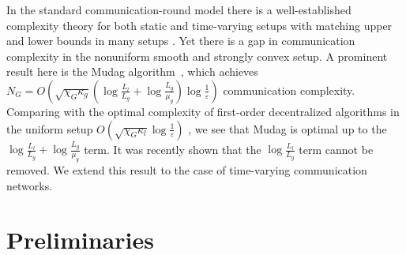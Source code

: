\documentclass[a4paper,USenglish,cleveref, autoref, thm-restate]{lipics-v2021}
\newcommand{\eps}{\varepsilon}
\begin{document}
In the standard communication-round model there is a well-established complexity theory for both static and time-varying setups with matching upper and lower bounds in many setups \cite{scaman2017optimal,kovalev2021lower,scaman2019optimal,yarmoshik2025decentralized,koloskova2024optimization,tyurin2024optimal,li2024accelerated}.
Yet there is a gap in communication complexity in the nonuniform smooth and strongly convex setup. 
A prominent result here is the Mudag algorithm~\cite{ye2023multi}, which achieves $N_G = O\left(\sqrt{\chi_G \kappa_g} \left(\log{\frac{L_l}{L_g}} + \log{\frac{L_g}{\mu_g}}\right)\log{\frac{1}{\eps}}\right)$ communication complexity. %
Comparing with the optimal complexity of first-order decentralized algorithms in the uniform setup 
$O\left(\sqrt{\chi_G \kappa_l} \log{\frac{1}{\eps}}\right)$ \cite{scaman2017optimal,kovalev2020optimal}, we see that Mudag is optimal up to the $\log{\frac{L_l}{L_g}} + \log{\frac{L_g}{\mu_g}}$ term.
It was recently shown \cite{KovKupRog26} that the $\log \frac{L_l}{L_g}$ term cannot be removed.
We extend this result to the case of time-varying communication networks. 

\section{Preliminaries}\label{sec:prelims}
\end{document}
